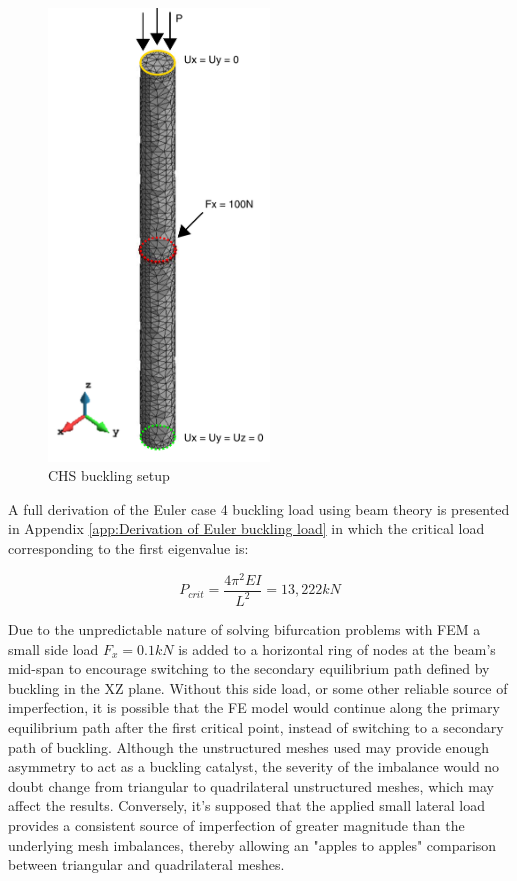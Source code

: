 \begin{figure}[H]
	\centering
	\includegraphics[height=12cm]{images/chs_buckling_setup}
	\caption{CHS buckling setup}
	\label{fig:chsbucklingsetup}
\end{figure}

A full derivation of the Euler case 4 buckling load using beam theory is presented in Appendix \ref{app:Derivation of Euler buckling load} in which the critical load corresponding to the first eigenvalue is:

\begin{equation} 
P_{crit} = \frac{4\pi^2 EI}{L^2} = 13, 222 kN
\label{eqchs_1}
\end{equation}

Due to the unpredictable nature of solving bifurcation problems with FEM a small side load $F_x = 0.1 kN$ is added to a horizontal ring of nodes at the beam's mid-span to encourage switching to the secondary equilibrium path defined by buckling in the XZ plane. Without this side load, or some other reliable source of imperfection, it is possible that the FE model would continue along the primary equilibrium path after the first critical point, instead of switching to a secondary path of buckling. Although the unstructured meshes used may provide enough asymmetry to act as a buckling catalyst, the severity of the imbalance would no doubt change from triangular to quadrilateral unstructured meshes, which may affect the results. Conversely, it's supposed that the applied small lateral load provides a consistent source of imperfection  of greater magnitude than the underlying mesh imbalances, thereby allowing an "apples to apples" comparison between triangular and quadrilateral meshes.


